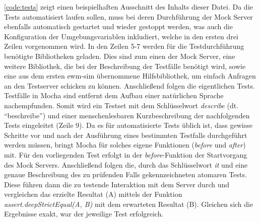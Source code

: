 \autoref{code:tests} zeigt einen beispielhaften Ausschnitt des Inhalts dieser Datei.
Da die Tests automatisiert laufen sollen, muss bei deren Durchführung der Mock Server ebenfalls automatisch gestartet und wieder gestoppt werden, was auch die Konfiguration der Umgebungsvariablen inkludiert, welche in den ersten drei Zeilen vorgenommen wird.
In den Zeilen 5-7 werden für die Testdurchführung benötigte Bibliotheken geladen.
Dies sind zum einen der Mock Server, eine weitere Bibliothek, die bei der Beschreibung der Testfälle benötigt wird, sowie eine aus dem ersten \ac{ewm-sim} übernommene Hilfsbibliothek, um einfach Anfragen an den Testserver schicken zu können.
Anschließend folgen die eigentlichen Tests.
Testfälle in Mocha sind entfernt dem Aufbau einer natürlichen Sprache nachempfunden.
Somit wird ein Testset mit dem Schlüsselwort \emph{describe} (dt. \enquote{beschreibe}) und einer menschenlesbaren Kurzbeschreibung der nachfolgenden Tests eingeleitet (Zeile 9).
Da es für automatisierte Tests üblich ist, dass gewisse Schritte vor und nach der Ausführung eines bestimmten Testfalls durchgeführt werden müssen, bringt Mocha für solches eigene Funktionen (\emph{before} und \emph{after}) mit.
Für den vorliegenden Test erfolgt in der \emph{before}-Funktion der Startvorgang des Mock Servers.
Anschließend folgen die, durch das Schlüsselwort \emph{it} und eine genaue Beschreibung des zu prüfenden Falls gekennzeichneten atomaren Tests.
Diese führen dann die zu testende Interaktion mit dem Server durch und vergleichen das erzielte Resultat (A) mittels der Funktion \emph{assert.deepStrictEqual(A, B)} mit dem erwarteten Resultat (B).
Gleichen sich die Ergebnisse exakt, war der jeweilige Test erfolgreich.



